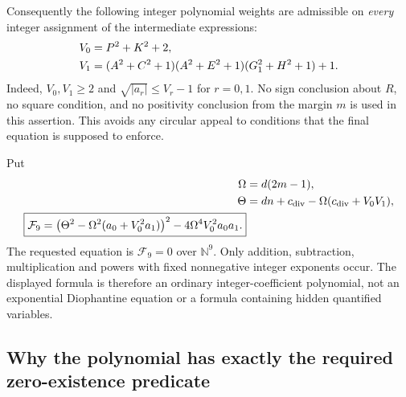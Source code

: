 Consequently the following integer polynomial weights are admissible
on \emph{every} integer assignment of the intermediate expressions:
\begin{align}
 V_0&=P^2+K^2+2,\notag\\
 V_1&=(A^2+C^2+1)(A^2+E^2+1)(G_1^2+H^2+1)+1.
 \label{eq:nine-weights}
\end{align}
Indeed, $V_0,V_1\geq2$ and
$\sqrt{|a_r|}\leq V_r-1$ for $r=0,1$.
No sign conclusion about $R$, no square condition, and no positivity
conclusion from the margin $m$ is used in this assertion.
This avoids any circular appeal to conditions that the final equation
is supposed to enforce.

Put
\begin{align}
 \Omega&=d(2m-1),\notag\\
 \Theta&=dn+c_\mathrm{div}
          -\Omega(c_\mathrm{div}+V_0V_1),\notag\\
 \boxed{\displaystyle
 \mathcal F_9=
 \bigl(\Theta^2-\Omega^2(a_0+V_0^2a_1)\bigr)^2
          -4\Omega^4V_0^2a_0a_1.}
 \label{eq:nine-final}
\end{align}
The requested equation is $\mathcal F_9=0$ over $\mathbb N^9$.
Only addition, subtraction, multiplication and powers with fixed
nonnegative integer exponents occur.  The displayed formula is therefore
an ordinary integer-coefficient polynomial, not an exponential
Diophantine equation or a formula containing hidden quantified variables.

\subsection{Why the polynomial has exactly the required zero-existence predicate}

